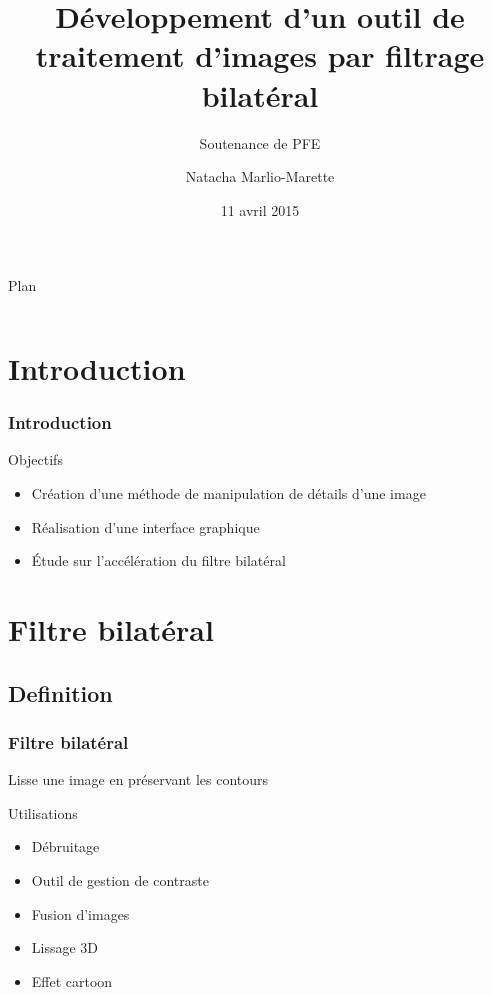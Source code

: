 \documentclass[compress]{beamer}
\title[Développement d'un outil de traitement d'images]{Développement d'un outil de traitement d'images par filtrage bilatéral}
\subtitle{Soutenance de PFE}
\author{Natacha Marlio-Marette}
\institute{\textbf{Polytech Tours} \vspace{.10cm} \\ DI5 2014-2015 \vspace{.10cm} \\ encadré par \\ Moncef Hidane}
\date[11/05/15]{11 avril 2015}
\begin{document}
\frame{
	\titlepage
}

\begin{frame}{Plan}
  \begin{columns}[t]
  \begin{column}{5cm}
  \tableofcontents[sections={1-4}]
  \end{column}
  \begin{column}{5cm}
  \tableofcontents[sections={5-8}]
  \end{column}
  \end{columns}
\end{frame}

\section{Introduction}
\begin{frame}
\frametitle{Introduction}
	\begin{block}{Objectifs}
		\begin{itemize}
			\item Création d'une méthode de manipulation de détails d'une image
			\item Réalisation d'une interface graphique
			\item \'Etude sur l'accélération du filtre bilatéral
		\end{itemize}
	\end{block}
\end{frame}

\section{Filtre bilatéral}
\subsection{Definition}
\begin{frame}\frametitle{Filtre bilatéral}
	\begin{definition}
		Lisse une image en préservant les contours
	\end{definition}
\pause
	\begin{block}{Utilisations}
		\begin{itemize}
			\item Débruitage
			\item Outil de gestion de contraste
			\item Fusion d'images
			\item Lissage 3D
			\item Effet cartoon
		\end{itemize}
	
	\end{block}
\end{frame}
\end{document}
